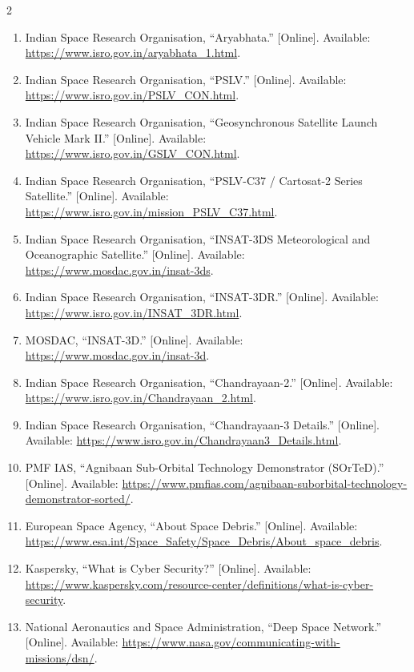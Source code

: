 \begin{multicols}{2}
\begin{enumerate}[leftmargin=*,itemsep=0.20em,topsep=0.12em,parsep=0pt]
    \item Indian Space Research Organisation, “Aryabhata.” [Online]. Available:
      \url{https://www.isro.gov.in/aryabhata_1.html}.
    \item Indian Space Research Organisation, “PSLV.” [Online]. Available:
      \url{https://www.isro.gov.in/PSLV_CON.html}.
    \item Indian Space Research Organisation, “Geosynchronous Satellite Launch Vehicle Mark II.”
      [Online]. Available: \url{https://www.isro.gov.in/GSLV_CON.html}.
    \item Indian Space Research Organisation, “PSLV-C37 / Cartosat-2 Series Satellite.” [Online].
      Available: \url{https://www.isro.gov.in/mission_PSLV_C37.html}.
    \item Indian Space Research Organisation, “INSAT-3DS Meteorological and Oceanographic Satellite.”
      [Online]. Available: \url{https://www.mosdac.gov.in/insat-3ds}.
    \item Indian Space Research Organisation, “INSAT-3DR.” [Online]. Available:
      \url{https://www.isro.gov.in/INSAT_3DR.html}.
    \item MOSDAC, “INSAT-3D.” [Online]. Available: \url{https://www.mosdac.gov.in/insat-3d}.
    \item Indian Space Research Organisation, “Chandrayaan-2.” [Online]. Available:
      \url{https://www.isro.gov.in/Chandrayaan_2.html}.
    \item Indian Space Research Organisation, “Chandrayaan-3 Details.” [Online]. Available:
      \url{https://www.isro.gov.in/Chandrayaan3_Details.html}.
    \item PMF IAS, “Agnibaan Sub-Orbital Technology Demonstrator (SOrTeD).” [Online]. Available:
      \url{https://www.pmfias.com/agnibaan-suborbital-technology-demonstrator-sorted/}.
    \item European Space Agency, “About Space Debris.” [Online]. Available:
      \url{https://www.esa.int/Space_Safety/Space_Debris/About_space_debris}.
    \item Kaspersky, “What is Cyber Security?” [Online]. Available:
      \url{https://www.kaspersky.com/resource-center/definitions/what-is-cyber-security}.
    \item National Aeronautics and Space Administration, “Deep Space Network.” [Online]. Available:
      \url{https://www.nasa.gov/communicating-with-missions/dsn/}.
  \end{enumerate}
  \par\endgroup



\end{multicols}
\endgroup
